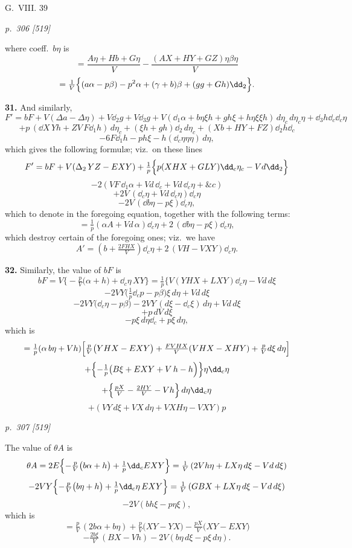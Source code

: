 \documentclass[11pt,a4paper]{book}
\begin{document}
\hfill G.\ VIII. \hfill 39

\clearpage

\bigskip
\textit{p.~306 [519]}
\smallskip

\noindent
where coeff.\ $b\eta$ is
\[
= \frac{A\eta + H b + G\eta}{V} - \frac{(AX + HY + G Z)\eta\beta\eta}{V}
\]
\[
= \tfrac{1}{V}\Bigl\{(a\alpha - p\beta) - p^2 \alpha + (\gamma + b)\beta + (g g + G h)\dd_{2}\Bigr\}.
\]

\textbf{31.} And similarly,
\[
F' = b F + V(\Delta a - \Delta\eta) + V\dd_{2} g + V\dd_{3} g + V(\dd_{1} \alpha + b\eta\xi h + g h\xi + h\eta\xi\xi h)\,d\eta_{c}\,d\eta_{c}\eta + \dd_{3} h\dd_{c}\dd_{c}\eta
\]
\[
+ p\,(\dd X\,Y h + Z V\,F\dd_{1} h)\,d\eta_{c} + (\xi h + g h)\dd_{2}\,d\eta_{c} + (X b + H Y + F Z)\dd_{2} h\dd_{c}
\]
\[
- 6 F\dd_{1} h - p h\xi - h(\dd_{c}\eta\eta\eta)\,d\eta,
\]
which gives the following formul\ae{}; viz.\ on these lines
\[
F' = b F + V(\Delta_{2}\,YZ - EXY) + \tfrac{1}{p}\Bigl\{p(XHX + GLY)\dd_{c}\eta_{c} - Vd\dd_{2}\Bigr\}
\]
\[
- 2(VF\,\dd_{1} \alpha + Vd\,\dd_{c} + Vd\,\dd_{c}\eta + \&c)
\]
\[
+ 2V\,(\dd_{c}\eta + Vd\,\dd_{c}\eta)\dd_{c}\eta
\]
\[
- 2V\,(\dd b\eta - p\xi)\dd_{c}\eta,
\]
which to denote in the foregoing equation, together with the following terms:
\[
= \tfrac{1}{p}(\alpha A + Vd\,\alpha)\dd_{c}\eta + 2\,(\dd b\eta - p\xi)\dd_{c}\eta,
\]
which destroy certain of the foregoing ones; viz.\ we have
\[
A' = (\textstyle b + \tfrac{2 F H X}{V})\dd_{c}\eta + 2\,(VH - V XY)\dd_{c}\eta.
\]

\textbf{32.} Similarly, the value of $bF$ is
\[
bF = V\bigl\{-\tfrac{p}{V}\bigl(\alpha + h\bigr) + \dd_{c}\eta\,XY\bigr\} = \tfrac{1}{p}\bigl\{V(YHX + LXY)\dd_{c}\eta - Vd\,d\xi
\]
\[
- 2VY\bigl(\tfrac{1}{p}\dd_{c}p - p\beta\bigr)\xi\,d\eta + Vd\,d\xi
\]
\[
- 2VY\bigl(\dd_{c}\eta - p\beta\bigr) - 2VY\,(d\xi - \dd_{c}\xi)\,d\eta + Vd\,d\xi
\]
\[
+ p\,d V\,d\xi
\]
\[
- p\xi\,d\eta\dd_{c} + p\xi\,d\eta,
\]
which is
\[
= \tfrac{1}{p}(\alpha\,b\eta + Vh)\Bigl[\tfrac{p}{V}\bigl(YHX - EXY\bigr) + \tfrac{F V H X}{V}(VHX - XHY) + \tfrac{p}{V}d\xi\,d\eta\Bigr]
\]
\[
+ \Bigl\{-\tfrac{1}{p}\bigl(B\xi + EXY + V\,h - h\Bigr)\Bigr\}\eta\dd_{c}\eta
\]
\[
+ \Bigl\{\tfrac{p X}{V} - \tfrac{2 H Y}{V} - V h\Bigr\}\,d\eta\dd_{c}\eta
\]
\[
+ (V Y\,d\xi + V X\,d\eta + V X H\eta - V X Y)p
\]

\clearpage

\bigskip
\textit{p.~307 [519]}
\smallskip

\noindent
The value of $\theta A$ is
\[
\theta A = 2 E\Bigl\{-\tfrac{p}{V}\bigl(b\alpha + h\bigr) + \tfrac{1}{p}\dd_{c}EXY\Bigr\} = \tfrac{1}{V}\,(2 V h\eta + LX\eta\,d\xi - V d\,d\xi)
\]
\[
- 2VY\Bigl\{-\tfrac{p}{V}\bigl(b\eta + h\bigr) + \tfrac{1}{p}\dd_{c}\eta\,EXY\Bigr\} = \tfrac{1}{V}\,(GBX + LX\eta\,d\xi - V d\,d\xi)
\]
\[
- 2 V (b h\xi - p\eta\xi),
\]
which is
\[
= \tfrac{p}{V}\,(2 b\alpha + b\eta) + \tfrac{p}{V}\bigl(XY - YX\bigr) - \tfrac{p X}{V}\bigl(XY - EXY\bigr)
\]
\[
- \tfrac{2 b\xi}{V}\,(B X - V h) - 2 V(b\eta\,d\xi - p\xi\,d\eta).
\]
\end{document}
